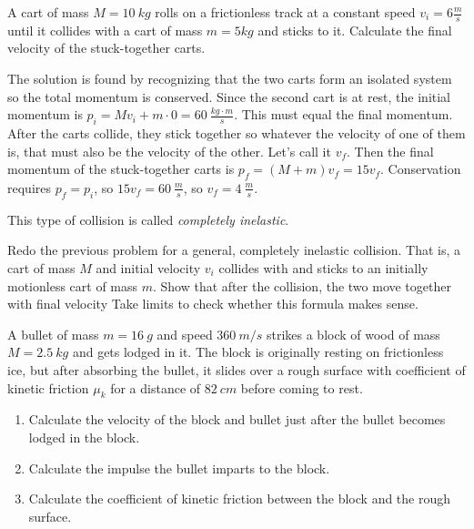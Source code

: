 
\begin{example}
A cart of mass $M = 10 \ kg$ rolls on a frictionless track at a constant speed $v_i=6 \frac ms$ until it collides with a cart of mass $m = 5 kg$ and sticks to it. Calculate the final velocity of the stuck-together carts. 

The solution is found by recognizing that the two carts form an isolated system so the total momentum is conserved. Since the second cart is at rest, the initial momentum is $p_i = Mv_i + m \cdot 0 = 60\ \frac{kg\cdot m}s$. This must equal the final momentum. After the carts collide, they stick together so whatever the velocity of one of them is, that must also be the velocity of the other. Let's call it $v_f$. Then the final momentum of the stuck-together carts is $p_f = (M+m)v_f = 15 v_f$. Conservation requires $p_f=p_i$, so $15 v_f = 60\ \frac{m}s$, so $v_f = 4\ \frac ms$.
\end{example}



This type of collision is called {\em completely inelastic}. 
\begin{exercise}
Redo the previous problem for a general, completely inelastic collision. That is, a cart of mass $M$ and initial velocity $v_i$ collides with and sticks to an initially motionless cart of mass $m$. 
Show that after the collision, the two move together with final velocity
Take limits to check whether this formula makes sense.
\end{exercise}


\begin{exercise} 
\label{X:BulletBlock}
A bullet of mass $m = 16\ g$ and speed $360\ m/s$ strikes a block of wood of mass $M= 2.5\ kg$ and gets lodged in it. The block is originally resting on frictionless ice, but after absorbing the bullet, it slides over a rough surface with coefficient of kinetic friction $μ_k$ for a distance of $82\ cm$ before coming to rest.
\begin{enumerate}
\item Calculate the velocity of the block and bullet just after the bullet becomes lodged in the block. 
\item Calculate the impulse the bullet imparts to the block. 
\item Calculate the coefficient of kinetic friction between the block and the rough surface.
\end{enumerate} 
\end{exercise} 



